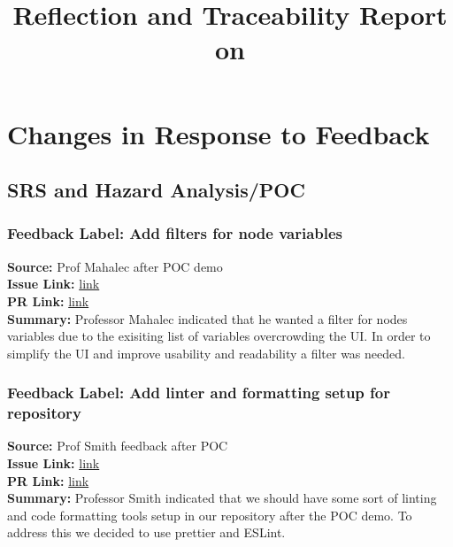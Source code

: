\documentclass{article}
\title{Reflection and Traceability Report on \progname}
\author{\authname}
\date{}
\begin{document}
\maketitle


\section{Changes in Response to Feedback}

\subsection{SRS and Hazard Analysis/POC}

    
    \subsubsection*{Feedback Label: Add filters for node variables}
    \textbf{Source:} Prof Mahalec after POC demo \\
    \textbf{Issue Link:} \href{https://github.com/MadhuranS/capstone/issues/97}{link} \\
    \textbf{PR Link:} \href{https://github.com/MadhuranS/capstone/pull/130}{link} \\
    \textbf{Summary:} Professor Mahalec indicated that he wanted a filter for nodes variables due to the exisiting list of variables overcrowding the UI. In order to simplify the UI and improve usability and readability a filter was needed. 

    \subsubsection*{Feedback Label: Add linter and formatting setup for repository}
    \textbf{Source:} Prof Smith feedback after POC \\
    \textbf{Issue Link:} \href{https://github.com/MadhuranS/capstone/issues/161}{link} \\
    \textbf{PR Link:} \href{https://github.com/MadhuranS/capstone/pull/132}{link} \\
    \textbf{Summary:} Professor Smith indicated that we should have some sort of linting and code formatting tools setup in our repository after the POC demo. To address this we decided to use prettier and ESLint. 
\end{document}
